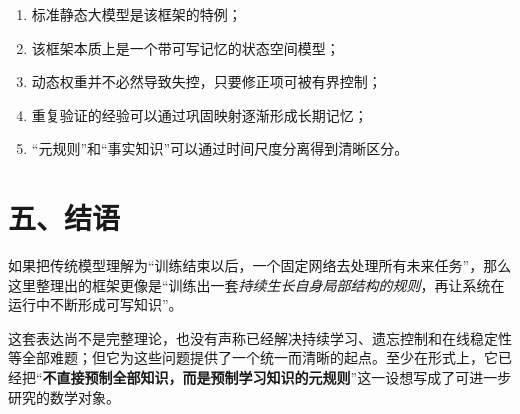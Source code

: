 \documentclass[11pt]{article}
\begin{document}
\begin{tcolorbox}[breakable,colback=LightAccent,colframe=Accent,boxrule=0.7pt,title=核心结论]
\begin{enumerate}[leftmargin=1.6em]
  \item 标准静态大模型是该框架的特例；
  \item 该框架本质上是一个带可写记忆的状态空间模型；
  \item 动态权重并不必然导致失控，只要修正项可被有界控制；
  \item 重复验证的经验可以通过巩固映射逐渐形成长期记忆；
  \item “元规则”和“事实知识”可以通过时间尺度分离得到清晰区分。
\end{enumerate}
\end{tcolorbox}

\section*{五、结语}
如果把传统模型理解为“训练结束以后，一个固定网络去处理所有未来任务”，那么这里整理出的框架更像是“训练出一套\emph{持续生长自身局部结构的规则}，再让系统在运行中不断形成可写知识”。

这套表达尚不是完整理论，也没有声称已经解决持续学习、遗忘控制和在线稳定性等全部难题；但它为这些问题提供了一个统一而清晰的起点。至少在形式上，它已经把“\textbf{不直接预制全部知识，而是预制学习知识的元规则}”这一设想写成了可进一步研究的数学对象。
\end{document}
